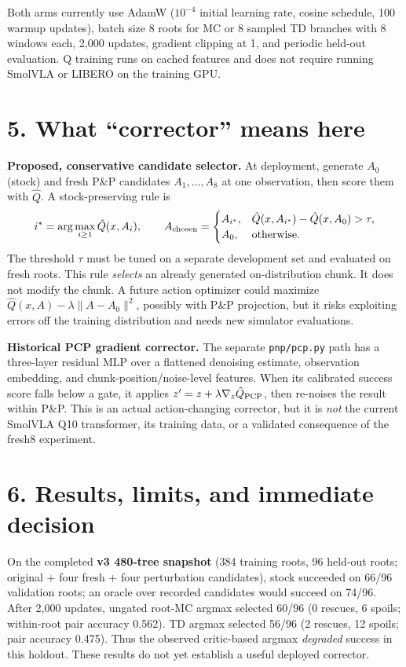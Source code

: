 \documentclass[10pt,letterpaper]{article}
\begin{document}
Both arms currently use AdamW ($10^{-4}$ initial learning rate, cosine schedule, 100 warmup updates), batch size 8 roots for MC or 8 sampled TD branches with 8 windows each, 2,000 updates, gradient clipping at 1, and periodic held-out evaluation. Q training runs on cached features and does not require running SmolVLA or LIBERO on the training GPU.

\section*{5. What ``corrector'' means here}
\textbf{Proposed, conservative candidate selector.} At deployment, generate $A_0$ (stock) and fresh P\&P candidates $A_1,\dots,A_8$ at one observation, then score them with $\hat Q$. A stock-preserving rule is
\begin{equation}
i^*=\arg\max_{i\ge1}\hat Q(x,A_i),\qquad
A_{\rm chosen}=\begin{cases}A_{i^*},&\hat Q(x,A_{i^*})-\hat Q(x,A_0)>\tau,\\A_0,&\text{otherwise.}\end{cases}
\end{equation}
The threshold $\tau$ must be tuned on a separate development set and evaluated on fresh roots. This rule \emph{selects} an already generated on-distribution chunk. It does not modify the chunk. A future action optimizer could maximize $\hat Q(x,A)-\lambda\lVert A-A_0\rVert^2$, possibly with P\&P projection, but it risks exploiting errors off the training distribution and needs new simulator evaluations.

\textbf{Historical PCP gradient corrector.} The separate \texttt{pnp/pcp.py} path has a three-layer residual MLP over a flattened denoising estimate, observation embedding, and chunk-position/noise-level features. When its calibrated success score falls below a gate, it applies $z' = z+\lambda\nabla_z\hat Q_{\rm PCP}$, then re-noises the result within P\&P. This is an actual action-changing corrector, but it is \emph{not} the current SmolVLA Q10 transformer, its training data, or a validated consequence of the fresh8 experiment.

\newpage
\section*{6. Results, limits, and immediate decision}
On the completed \textbf{v3 480-tree snapshot} (384 training roots, 96 held-out roots; original + four fresh + four perturbation candidates), stock succeeded on 66/96 validation roots; an oracle over recorded candidates would succeed on 74/96. After 2,000 updates, ungated root-MC argmax selected 60/96 (0 rescues, 6 spoils; within-root pair accuracy 0.562). TD argmax selected 56/96 (2 rescues, 12 spoils; pair accuracy 0.475). Thus the observed critic-based argmax \emph{degraded} success in this holdout. These results do not yet establish a useful deployed corrector.
\end{document}

